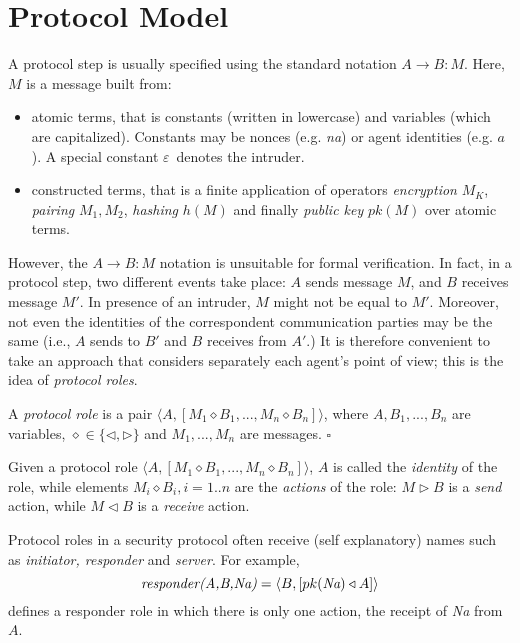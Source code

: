 \documentclass{entcs} \usepackage{entcsmacro}
\newcommand{\IO}{\ensuremath{\diamond}}
\newcommand{\IN}{\ensuremath{\triangleleft}}
\newcommand{\OUT}{\ensuremath{\triangleright}}
\newcommand{\HB}{\hfill{$\square$}}
\newcommand{\INT}{\ensuremath{\varepsilon}}
\begin{document}
\section{Protocol Model}
\label{sec:protmodel}

A protocol step is usually specified using the standard notation $A
\rightarrow B: M$. Here, $M$ is a message built from:
\begin{itemize}
\item atomic terms, that is constants (written in lowercase) and
  variables (which are capitalized). Constants may be nonces (e.g.
  \emph{na}) or agent identities (e.g. $a$). A special constant \INT \ 
  denotes the intruder.
\item constructed terms, that is a finite application of operators
\emph{encryption} $M_K$, \emph{pairing} $M_1,M_2$, \emph{hashing}
$h(M)$ and finally \emph{public key} $pk(M)$ over atomic terms.
\end{itemize}
However, the $A \rightarrow B: M$ notation is unsuitable for formal
verification.  In fact, in a protocol step, two different events take
place: $A$ sends message $M$, and $B$ receives message $M'$.  In
presence of an intruder, $M$ might not be equal to $M'$.  Moreover,
not even the identities of the correspondent communication parties may
be the same (i.e., $A$ sends to $B'$ and $B$ receives from $A'$.)  It
is therefore convenient to take an approach that considers separately
each agent's point of view; this is the idea of \emph{protocol roles}.

\begin{definition}
  A \emph{protocol role} is a pair $\langle A , [M_1 \IO B_1, ..., M_n
  \IO B_n] \rangle$, where $A, B_1,...,B_n$ are variables, $\IO \in
  \{ \IN, \OUT \}$ and $M_1,...,M_n$ are messages. \HB
\end{definition}

Given a protocol role $\langle A , [M_1 \IO B_1, ..., M_n \IO B_n]
\rangle$, $A$ is called the \emph{identity} of the role, while elements 
$M_i \IO B_i, i=1..n$ 
are the \emph{actions} of the role: $M \triangleright B$ is a \emph{send} 
action, while $M \triangleleft B$ is a \emph{receive} action.

Protocol roles in a security protocol often receive (self explanatory)
names such as \emph{initiator, responder} and \emph{server}.  For
example,
\begin{equation}
\label{eq}
 \emph{responder(A,B,Na)}=\langle B, [pk(\emph{Na}) \triangleleft A]\rangle
\end{equation}
defines a responder role in which there is only one action, the receipt of
\emph{Na} from $A$.  
\end{document}
